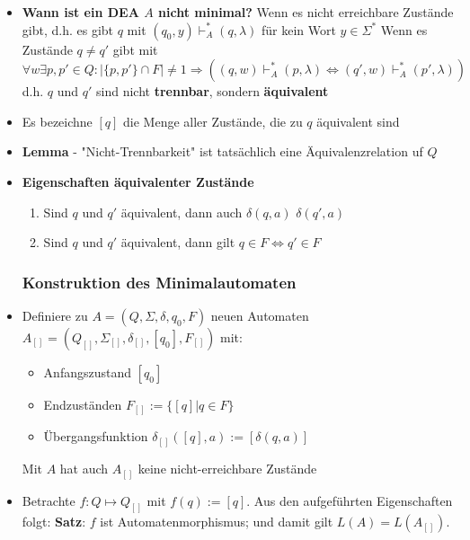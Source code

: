 \documentclass[12pt, a4paper]{article}
\begin{document}
	\begin{itemize}
		
		\item \textbf{Wann ist ein DEA $A$ nicht minimal?}
		\subitem Wenn es nicht erreichbare Zustände gibt, d.h. es gibt $q$ mit $(q_{0},y)\vdash^{*}_{A}(q,\lambda)$ für kein Wort $y\in\Sigma^{*}$
		\subitem Wenn es Zustände $q\neq q'$ gibt mit $\forall w\exists p,p'\in Q:|\{p,p'\}\cap F|\neq1\Rightarrow((q,w)\vdash^{*}_{A}(p,\lambda)\Leftrightarrow(q',w)\vdash^{*}_{A}(p',\lambda))$ d.h. $q$ und $q'$ sind nicht \textbf{trennbar}, sondern \textbf{äquivalent}
		
		\item Es bezeichne $[q]$ die Menge aller Zustände, die zu $q$ äquivalent sind
		
		\item \textbf{Lemma} - "Nicht-Trennbarkeit" ist tatsächlich eine Äquivalenzrelation uf $Q$
		
		\item \textbf{Eigenschaften äquivalenter Zustände}
		\begin{enumerate}
			\item Sind $q$ und $q'$ äquivalent, dann auch $\delta(q,a)$ $\delta(q',a)$
			\item Sind $q$ und $q'$ äquivalent, dann gilt $q\in F\Leftrightarrow q'\in F$
		\end{enumerate}
		
		
		\subsubsection{Konstruktion des Minimalautomaten}
		
		\item Definiere zu $A=(Q,\Sigma,\delta,q_{0},F)$ neuen Automaten $A_{[]}=(Q_{[]},\Sigma_{[]},\delta_{[]},[q_{0}],F_{[]})$ mit:
			\begin{itemize}
				\item Anfangszustand $[q_{0}]$
				\item Endzuständen $F_{[]}:=\{[q]|q\in F\}$
				\item Übergangsfunktion $\delta_{[]}([q],a):=[\delta(q,a)]$
		\end{itemize}
			\subitem Mit $A$ hat auch $A_{[]}$ keine nicht-erreichbare Zustände
			
		\item Betrachte $f:Q\mapsto Q_{[]}$ mit $f(q):=[q]$. Aus den aufgeführten Eigenschaften folgt:
		\subitem \textbf{Satz}: $f$ ist Automatenmorphismus; und damit gilt $L(A)=L(A_{[]})$.
		

\end{itemize}
\end{document}
